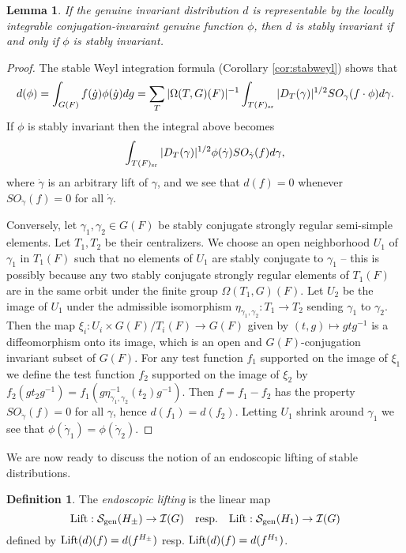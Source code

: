 \documentclass{article}
\newtheorem{lem}[thm]{Lemma}
\theoremstyle{definition}
\newtheorem{dfn}[thm]{Definition}
\numberwithin{equation}{section}
\renewcommand{\-}{\hyp{}}
\begin{document}
\begin{lem} \label{lem:stabfun}
	If the genuine invariant distribution $d$ is representable by the locally integrable conjugation-invaraint genuine function $\phi$, then $d$ is stably invariant if and only if $\phi$ is stably invariant.
\end{lem}
\begin{proof}
	The stable Weyl integration formula (Corollary \ref{cor:stabweyl}) shows that 
	\[ d(\phi) = \int_{G(F)} f(\dot g)\phi(\dot g)dg = \sum_T |\Omega(T,G)(F)|^{-1}\int_{T(F)_{\textrm{sr}}}|D_T(\gamma)|^{1/2}SO_\gamma(f \cdot \phi)d\gamma.\]
	If $\phi$ is stably invariant then the integral above becomes
	\[ \int_{T(F)_{\textrm{sr}}} |D_T(\gamma)|^{1/2}\phi(\dot\gamma)SO_{\dot\gamma}(f)d\gamma, \]
	where $\dot\gamma$ is an arbitrary lift of $\gamma$, and we see that $d(f)=0$ whenever $SO_{\dot\gamma}(f)=0$ for all $\dot\gamma$. 
	
	Conversely, let $\gamma_1,\gamma_2 \in G(F)$ be stably conjugate strongly regular semi-simple elements. Let $T_1,T_2$ be their centralizers. We choose an open neighborhood $U_1$ of $\gamma_1$ in $T_1(F)$ such that no elements of $U_1$ are stably conjugate to $\gamma_1$ -- this is possibly because any two stably conjugate strongly regular elements of $T_1(F)$ are in the same orbit under the finite group $\Omega(T_1,G)(F)$. Let $U_2$ be the image of $U_1$ under the admissible isomorphism $\eta_{\gamma_1,\gamma_2}: T_1 \to T_2$ sending $\gamma_1$ to $\gamma_2$. Then the map $\xi_i : U_i \times G(F)/T_i(F) \to G(F)$ given by $(t,g) \mapsto gtg^{-1}$ is a diffeomorphism onto its image, which is an open and $G(F)$-conjugation invariant subset of $G(F)$. For any test function $f_1$ supported on the image of $\xi_1$ we define the test function $f_2$ supported on the image of $\xi_2$ by $f_2(gt_2g^{-1})=f_1(g\eta_{\gamma_1,\gamma_2}^{-1}(t_2)g^{-1})$. Then $f=f_1-f_2$ has the property $SO_{\dot\gamma}(f)=0$ for all $\gamma$, hence $d(f_1)=d(f_2)$. Letting $U_1$ shrink around $\gamma_1$ we see that $\phi(\dot\gamma_1)=\phi(\dot\gamma_2)$.
\end{proof}



We are now ready to discuss the notion of an endoscopic lifting of stable distributions.

\begin{dfn} \label{dfn:stabtrans}
The \emph{endoscopic lifting} is the linear map 
\[ \textrm{Lift} : \mathcal{S}_{\textrm{gen}}(H_\pm) \to \mathcal{I}(G) \quad \textrm{resp.}\quad \textrm{Lift} : \mathcal{S}_{\textrm{gen}}(H_1) \to \mathcal{I}(G)\] 
defined by $\textrm{Lift}(d)(f)=d(f^{H_\pm})$ resp. $\textrm{Lift}(d)(f)=d(f^{H_1})$.
\end{dfn}
\end{document}
